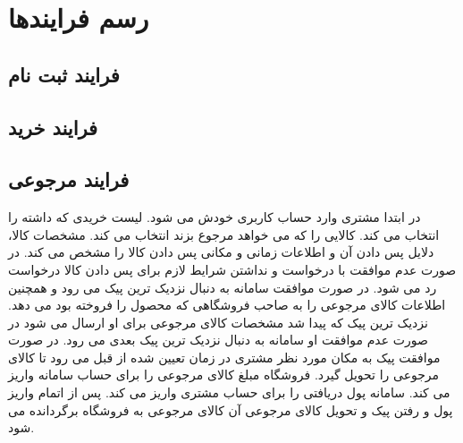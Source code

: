 \documentclass[12pt,a4paper]{article}
\begin{document}
\maketitle
\pagebreak
\tableofcontents
\pagebreak
\listoffigures
\pagebreak
\normalsize	



\pagebreak
\section{رسم فرایندها} \label{section.function}

\subsection{فرایند ثبت نام} \label{section.function.register}


\subsection{فرایند خرید} \label{section.function.buy}


\subsection{فرایند مرجوعی} \label{section.function.return}

در ابتدا مشتری وارد حساب کاربری خودش می شود. لیست خریدی که داشته را انتخاب می کند. کالایی را که می خواهد مرجوع بزند انتخاب می کند. مشخصات کالا، دلایل پس دادن آن و اطلاعات زمانی و مکانی پس دادن کالا را مشخص می کند. در صورت عدم موافقت با درخواست و نداشتن شرایط لازم برای پس دادن کالا درخواست رد می شود. در صورت موافقت سامانه به دنبال نزدیک ترین پیک می رود و همچنین اطلاعات کالای مرجوعی را به صاحب فروشگاهی که محصول را فروخته بود می دهد. نزدیک ترین پیک که پیدا شد مشخصات کالای مرجوعی برای او ارسال می شود در صورت عدم موافقت او سامانه به دنبال نزدیک ترین پیک بعدی می رود. در صورت موافقت پیک به مکان مورد نظر مشتری در زمان تعیین شده از قبل می رود تا کالای مرجوعی را تحویل گیرد. فروشگاه مبلغ کالای مرجوعی را برای حساب سامانه واریز می کند. سامانه پول دریافتی را برای حساب مشتری واریز می کند. پس از اتمام واریز پول و رفتن پیک و تحویل کالای مرجوعی آن کالای مرجوعی به فروشگاه برگردانده می شود.

\pagebreak
\end{document}
